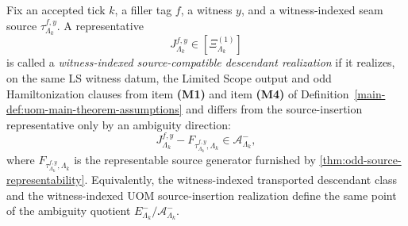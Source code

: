 \documentclass[11pt]{article}
\begin{document}
\begin{definition}
\label{def:source-compatible-witness-realization}
Fix an accepted tick \(k\), a filler tag \(f\), a witness \(y\), and a witness-indexed seam source
\(
\tau^{f,y}_{\Lambda_k}
\).
A representative
\[
J^{f,y}_{\Lambda_k}\in[\Xi^{(1)}_{\Lambda_k}]
\]
is called a \emph{witness-indexed source-compatible descendant realization} if it realizes, on the
same LS witness datum, the Limited Scope output and odd Hamiltonization clauses from item
\textbf{(M1)} and item \textbf{(M4)} of Definition~\ref{main-def:uom-main-theorem-assumptions} and differs
from the source-insertion representative only by an ambiguity direction:
\begin{equation}
J^{f,y}_{\Lambda_k}
-
F_{\tau^{f,y}_{\Lambda_k},\Lambda_k}
\in
\mathcal A^-_{\Lambda_k},
\label{eq:source-compatible-witness-realization}
\end{equation}
where
\(
F_{\tau^{f,y}_{\Lambda_k},\Lambda_k}
\)
is the representable source generator furnished by
\cref{thm:odd-source-representability}.
Equivalently, the witness-indexed transported descendant class and the witness-indexed UOM
source-insertion realization define the same point of the ambiguity quotient
\(
E^-_{\Lambda_k}/\mathcal A^-_{\Lambda_k}
\).
\end{definition}
\end{document}
